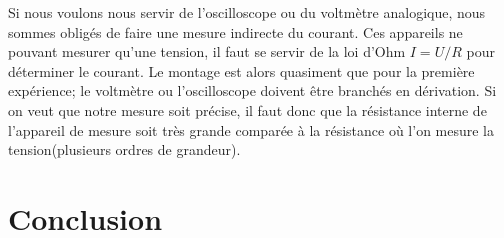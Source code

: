 \documentclass[10pt]{article}
\begin{document}
	Si nous voulons nous servir de l'oscilloscope ou du voltmètre analogique, nous sommes obligés de faire une mesure indirecte du courant. Ces appareils ne pouvant mesurer qu'une tension, il faut se servir de la loi d'Ohm $I=U/R$ pour déterminer le courant. Le montage est alors quasiment que pour la première expérience; le voltmètre ou l'oscilloscope doivent être branchés en dérivation. Si on veut que notre mesure soit précise, il faut donc que la résistance interne de l'appareil de mesure soit très grande comparée à la résistance où l'on mesure la tension(plusieurs ordres de grandeur). 

\section{Conclusion}
\end{document}
